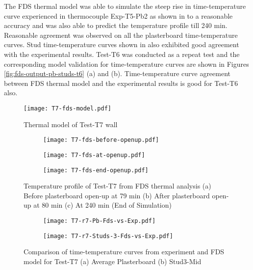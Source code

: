 The FDS thermal model was able to simulate the steep rise in time-temperature curve experienced in thermocouple Exp-T5-Pb2 as shown in  to a reasonable accuracy and was also able to predict the temperature profile till 240 min. Reasonable agreement was observed on all the plasterboard time-temperature curves. Stud time-temperature curves shown in  also exhibited good agreement with the experimental results. Test-T6 was conducted as a repeat test and the corresponding model validation for time-temperature curves are shown in Figures \ref{fig:fds-output-pb-studs-t6} (a) and (b). Time-temperature curve agreement between FDS thermal model and the experimental results is good for Test-T6 also.
\begin{figure}[!htbp]
	\centering
		\texttt{[image: T7-fds-model.pdf]}
		\caption{Thermal model of Test-T7 wall}
		\label{fig:T7-fds-model-cavity}
\end{figure}
\begin{figure}[!htbp]
	\centering
	\begin{subfigure}[b]{0.45\textwidth}
		\centering
		\texttt{[image: T7-fds-before-openup.pdf]}
		\caption{}
		\label{subfig:T7-fds-before-openup}
	\end{subfigure}
	\begin{subfigure}[b]{0.45\textwidth}
		\centering
		\texttt{[image: T7-fds-at-openup.pdf]}
		\caption{}
		\label{subfig:T7-fds-at-openup}
	\end{subfigure}
	\begin{subfigure}[b]{0.45\textwidth}
		\centering
		\texttt{[image: T7-fds-end-openup.pdf]}
		\caption{}
		\label{subfig:T7-fds-end-openup}
	\end{subfigure}
	   \caption{Temperature profile of Test-T7 from FDS thermal analysis (a) Before plasterboard open-up at 79 min (b) After plasterboard open-up at 80 min (c) At 240 min (End of Simulation)}
	   \label{fig:T7-fds-output}
\end{figure}
\begin{figure}[!htbp]
	\centering
	\begin{subfigure}[b]{0.7\textwidth}
		\centering
		\texttt{[image: T7-r7-Pb-Fds-vs-Exp.pdf]}
		\caption{}
		\label{subfig:T7-r7-Pb-Fds-vs-Exp}
	\end{subfigure}
	\begin{subfigure}[b]{0.6\textwidth}
		\centering
		\texttt{[image: T7-r7-Studs-3-Fds-vs-Exp.pdf]}
		\caption{}
		\label{subfig:T7-r7-Studs-3-Fds-vs-Exp}
	\end{subfigure}
	   \caption{Comparison of time-temperature curves from experiment and FDS model for Test-T7 (a) Average Plasterboard (b) Stud3-Mid}
	   \label{fig:fds-output-pb-studs-t7}
\end{figure}

